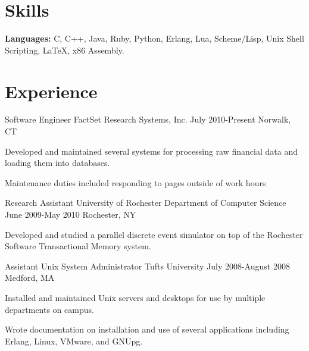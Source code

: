 \documentclass[letterpaper]{resume}
\author{Gregory Wilbur}
\begin{document}
\maketitle

\section{Skills}
\vspace{\secskip}

\begin{compactitem}
	\item \textbf{Languages:} C, C++, Java, Ruby, Python, Erlang, Lua, Scheme/Lisp, Unix Shell Scripting, \LaTeX, x86 Assembly. \par
\end{compactitem}

\section{Experience}

\affiliation
{Software Engineer}
{FactSet Research Systems, Inc.}
{July 2010-Present}
{Norwalk, CT}

\begin{compactitem}
	\item Developed and maintained several systems for processing raw financial data and loading them into databases. \par
	\item Maintenance duties included responding to pages outside of work hours \par
\end{compactitem}

\affiliation
{Research Assistant}
{University of Rochester Department of Computer Science}
{June 2009-May 2010}
{Rochester, NY}

\begin{compactitem}
	\item Developed and studied a parallel discrete event simulator on top of the Rochester Software Transactional Memory system. \par
\end{compactitem}

\affiliation
{Assistant Unix System Administrator}
{Tufts University}
{July 2008-August 2008}
{Medford, MA}

\begin{compactitem}
	\item Installed and maintained Unix servers and desktops for use by multiple departments on campus. \par
	\item Wrote documentation on installation and use of several applications including Erlang, Linux, VMware, and GNUpg. \par
\end{compactitem}
\end{document}

